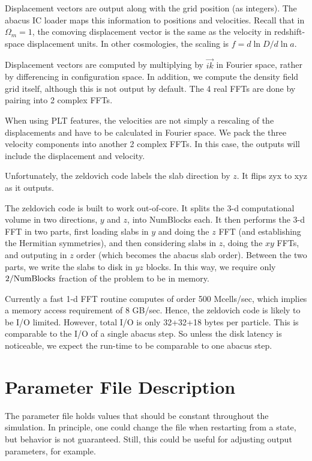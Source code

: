 \documentclass[11pt,preprint]{aastex}
\begin{document}
Displacement vectors are output along with the grid position (as
integers).  The abacus IC loader maps this information to positions
and velocities.  Recall that in $\Omega_m=1$, the comoving displacement
vector is the same as the velocity in redshift-space displacement
units.  In other cosmologies, the scaling is $f = d\ln D/d\ln a$.

Displacement vectors are computed by multiplying by $\vec{ik}$ in
Fourier space, rather by differencing in configuration space.  In
addition, we compute the density field grid itself, although this
is not output by default.  The 4 real FFTs are done by pairing into
2 complex FFTs.

When using PLT features, the velocities are not simply a rescaling
of the displacements and have to be calculated in Fourier space.
We pack the three velocity components into another 2 complex FFTs.
In this case, the outputs will include the displacement and velocity.

Unfortunately, the zeldovich code labels the slab direction by $z$.
It flips zyx to xyz as it outputs.

The zeldovich code is built to work out-of-core.  It splits the 3-d
computational volume in two directions, $y$ and $z$, into NumBlocks
each.  It then performs the 3-d FFT in two parts, first loading
slabs in $y$ and doing the $z$ FFT (and establishing the Hermitian
symmetries), and then considering slabs in $z$, doing the $xy$ FFTs,
and outputing in $z$ order (which becomes the abacus slab order).
Between the two parts, we write the slabs to disk in $yz$ blocks.
In this way, we require only $2/{\rm NumBlocks}$ fraction of the
problem to be in memory.

Currently a fast 1-d FFT routine computes of order 500 Mcells/sec,
which implies a memory access requirement of 8 GB/sec.  Hence, the
zeldovich code is likely to be I/O limited.  However, total I/O is 
only 32+32+18 bytes per particle.  This is comparable to the I/O 
of a single abacus step.  So unless the disk latency is noticeable,
we expect the run-time to be comparable to one abacus step.

\section{Parameter File Description}

The parameter file holds values that should be constant throughout the
simulation.  In principle, one could change the file when restarting
from a state, but behavior is not guaranteed.  Still, this could be
useful for adjusting output parameters, for example.
\end{document}

